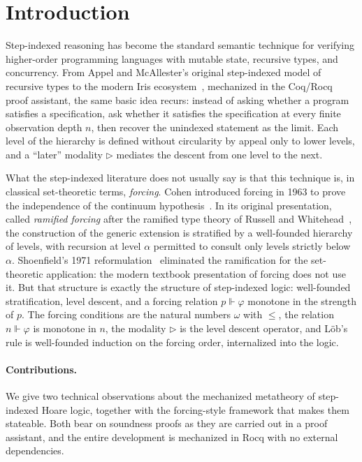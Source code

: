 \section{Introduction}
\label{sec:intro}

Step-indexed reasoning has become the standard semantic technique
for verifying higher-order programming languages with mutable state,
recursive types, and concurrency.  From Appel and McAllester's
original step-indexed model of recursive types
\cite{appel-mcallester2001} to the modern Iris
ecosystem~\cite{jung-et-al-2018}, mechanized in the Coq/Rocq proof
assistant, the same basic idea recurs: instead
of asking whether a program satisfies a specification, ask whether it
satisfies the specification at every finite observation depth $n$,
then recover the unindexed statement as the limit.  Each level of
the hierarchy is defined without circularity by appeal only to lower
levels, and a ``later'' modality $\triangleright$ mediates the
descent from one level to the next.

What the step-indexed literature does not usually say is that this
technique is, in classical set-theoretic terms, \emph{forcing}.
Cohen introduced forcing in 1963 to prove the independence of the
continuum hypothesis~\cite{cohen1963-independence-i, cohen1966}.  In
its original presentation, called \emph{ramified forcing} after
the ramified type theory of Russell and
Whitehead~\cite{russell-whitehead-PM}, the construction of the
generic extension is stratified by a well-founded hierarchy of
levels, with recursion at level $\alpha$ permitted to consult only
levels strictly below $\alpha$.  Shoenfield's 1971
reformulation~\cite{shoenfield1971} eliminated the ramification for
the set-theoretic application: the modern textbook presentation of
forcing does not use it.  But that structure is exactly the structure
of step-indexed logic: well-founded stratification, level descent, and
a forcing relation $p \Vdash \varphi$ monotone in the strength of $p$.  The forcing conditions are the natural numbers
$\omega$ with $\le$, the relation $n \Vdash \varphi$ is monotone in
$n$, the modality $\triangleright$ is the level descent operator,
and Löb's rule is well-founded induction on the forcing order,
internalized into the logic.

\paragraph{Contributions.}
We give two technical observations about the mechanized metatheory of
step-indexed Hoare logic, together with the forcing-style framework
that makes them stateable. Both bear on soundness proofs as they are
carried out in a proof assistant, and the entire development is
mechanized in Rocq with no external dependencies.

